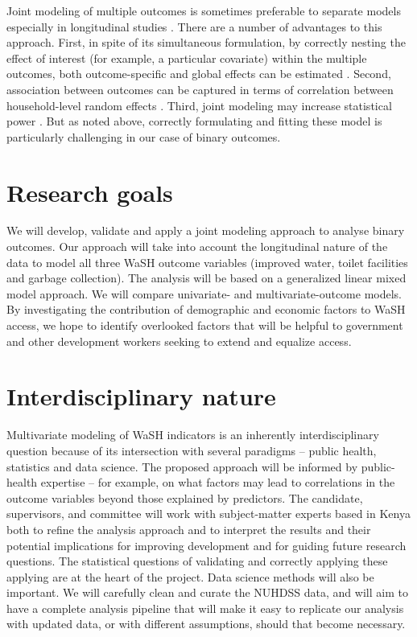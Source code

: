 Joint modeling of multiple outcomes is sometimes preferable to separate models especially in longitudinal studies \citep{dassimultaneous,fang2018joint,lalonde2019disc}. There are a number of advantages to this approach. First, in spite of its simultaneous formulation, by correctly nesting the effect of interest (for example, a particular covariate) within the multiple outcomes, both outcome-specific and global effects can be estimated \citep{dassimultaneous,lalonde2019disc}. Second, association between outcomes can be captured in terms of correlation between household-level random effects \citep{ivanova2016mixed}. Third, joint modeling may increase statistical power \citep{dassimultaneous}. But as noted above, correctly formulating and fitting these model is particularly challenging in our case of binary outcomes.

\section*{Research goals}

We will develop, validate and apply a joint modeling approach to analyse binary outcomes. Our approach will take into account the longitudinal nature of the data to model all three WaSH outcome variables (improved water, toilet facilities and garbage collection). The analysis will be based on a generalized linear mixed model approach. We will compare univariate- and multivariate-outcome models. By investigating the contribution of demographic and economic factors to WaSH access, we hope to identify overlooked factors that will be helpful to government and other development workers seeking to extend and equalize access.

\section*{Interdisciplinary nature}

Multivariate modeling of WaSH indicators is an inherently interdisciplinary question because of its intersection with several paradigms -- public health, statistics and data science. The proposed approach will be informed by public-health expertise – for example, on what factors may lead to correlations in the outcome variables beyond those explained by predictors. The candidate, supervisors, and committee will work with subject-matter experts based in Kenya both to refine the analysis approach and to interpret the results and their potential implications for improving development and for guiding future research questions. The statistical questions of validating and correctly applying these applying are at the heart of the project. Data science methods will also be important. We will carefully clean and curate the NUHDSS data, and will aim to have a complete analysis pipeline that will make it easy to replicate our analysis with updated data, or with different assumptions, should that become necessary.

